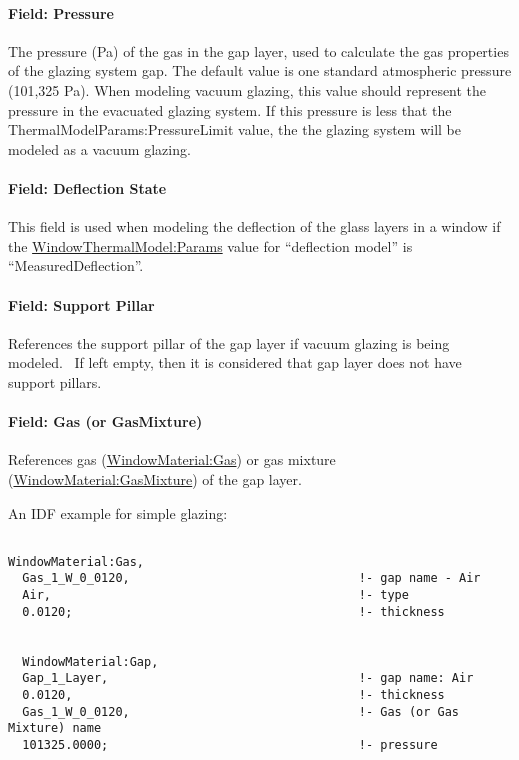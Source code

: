 \paragraph{Field: Pressure}\label{field-pressure-000}

The pressure (Pa) of the gas in the gap layer, used to calculate the gas properties of the glazing system gap. The default value is one standard atmospheric pressure (101,325 Pa). When modeling vacuum glazing, this value should represent the pressure in the evacuated glazing system. If this pressure is less that the ThermalModelParams:PressureLimit value, the the glazing system will be modeled as a vacuum glazing.

\paragraph{Field: Deflection State}\label{field-deflection-state}

This field is used when modeling the deflection of the glass layers in a window if the \hyperref[windowthermalmodelparams]{WindowThermalModel:Params} value for ``deflection model'' is ``MeasuredDeflection''.

\paragraph{Field: Support Pillar}\label{field-support-pillar}

References the support pillar of the gap layer if vacuum glazing is being modeled.~ If left empty, then it is considered that gap layer does not have support pillars.

\paragraph{Field: Gas (or GasMixture)}\label{field-gas-or-gasmixture}

References gas (\hyperref[windowmaterialgas]{WindowMaterial:Gas}) or gas mixture (\hyperref[windowmaterialgasmixture]{WindowMaterial:GasMixture}) of the gap layer.

An IDF example for simple glazing:

\begin{lstlisting}

WindowMaterial:Gas,
  Gas_1_W_0_0120,                                !- gap name - Air
  Air,                                           !- type
  0.0120;                                        !- thickness


  WindowMaterial:Gap,
  Gap_1_Layer,                                   !- gap name: Air
  0.0120,                                        !- thickness
  Gas_1_W_0_0120,                                !- Gas (or Gas Mixture) name
  101325.0000;                                   !- pressure
\end{lstlisting}

